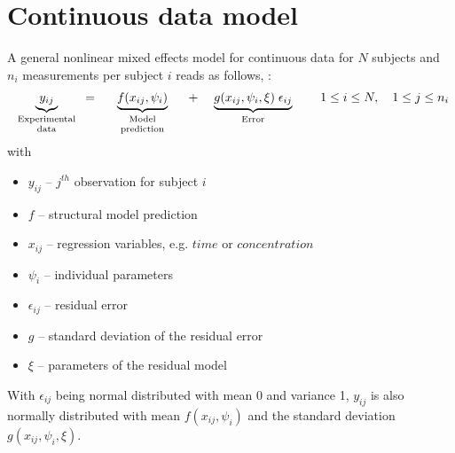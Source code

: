 \section{Continuous data model}
\label{sec:continuousDataModel}
A general nonlinear mixed effects model for continuous data for $N$ subjects and $n_i$ measurements per subject $i$ reads as follows, \cite{LavielleBook:2014}:
\begin{align}
 \underbrace{ y_{ij}}_{\text{\parbox{2cm}{\centering Experimental \\[-4pt]  data}}} =
 \underbrace{ f(x_{ij}, \psi_{i})}_{\text{\parbox{2.5cm}{\centering Model \\[-4pt]  prediction}}} + 
 \underbrace{ g(x_{ij}, \psi_{i}, \xi) \; \epsilon_{ij}}_{\text{\parbox{3cm}{\centering Error}}} 
\quad 1\le i \le N, \quad 1\le j \le n_i \label{eq:nlmeModel}
 \end{align}
with
\begin{itemize}
\item
$y_{ij}$ -- $j^{th}$ observation for subject $i$
\item
$f$ -- structural model prediction
\item
$x_{ij}$ -- regression variables, e.g. $time$ or $concentration$
\item
$\psi_{i}$ -- individual parameters
\item
$\epsilon_{ij}$ -- residual error
\item
$g$ -- standard deviation of the residual error
\item 
$\xi$ -- parameters of the residual model
\end{itemize}
With $\epsilon_{ij}$ being normal distributed with mean 0 and variance 1, $y_{ij}$ is also normally distributed with mean $ f(x_{ij}, \psi_{i})$ and the standard deviation $g(x_{ij}, \psi_{i}, \xi)$. 
